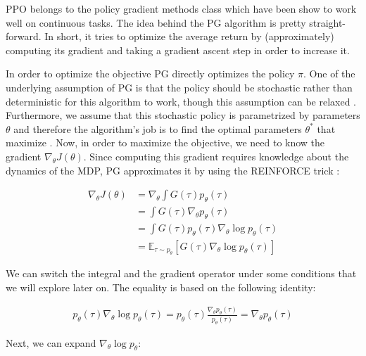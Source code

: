 \ac{PPO} belongs to the policy gradient methods class which have been show to work well on continuous tasks. The idea behind the \ac{PG} algorithm is pretty straight-forward. In short, it tries to optimize the average return by (approximately) computing its gradient and taking a gradient ascent step in order to increase it.

In order to optimize the objective \ac{PG} directly optimizes the policy $\pi$. One of the underlying assumption of \ac{PG} is that the policy should be stochastic rather than deterministic for this algorithm to work, though this assumption can be relaxed \cite{ddpg}. Furthermore, we assume that this stochastic policy is parametrized by parameters $\theta$ and therefore the algorithm's job is to find the optimal parameters $\theta^*$ that maximize . Now, in order to maximize the objective, we need to know the gradient $\nabla_\theta J(\theta)$. Since computing this gradient requires knowledge about the dynamics of the \ac{MDP}, \ac{PG} approximates it by using the REINFORCE trick \cite{williams1992simple}:

\begin{align}
    \label{eq:obj_grad}
    \nabla_\theta J(\theta) &= \nabla_\theta \int G(\tau) p_\theta(\tau) \\
    &= \int G(\tau) \nabla_\theta p_\theta(\tau)\\
    &= \int G(\tau) p_\theta(\tau) \nabla_\theta \log p_\theta(\tau)\\
    &= \mathbb{E}_{\tau \sim p_\theta} \left[ G(\tau) \nabla_\theta \log p_\theta(\tau) \right]
\end{align}

We can switch the integral and the gradient operator under some conditions that we will explore later on. The equality is based on the following identity:

\begin{align*}
    p_\theta(\tau)\nabla_\theta \log p_\theta(\tau) = p_\theta(\tau) \frac{\nabla_\theta p_\theta(\tau)}{p_\theta(\tau)} = \nabla_\theta p_\theta(\tau)
\end{align*}

Next, we can expand $\nabla_\theta \log p_\theta$:

